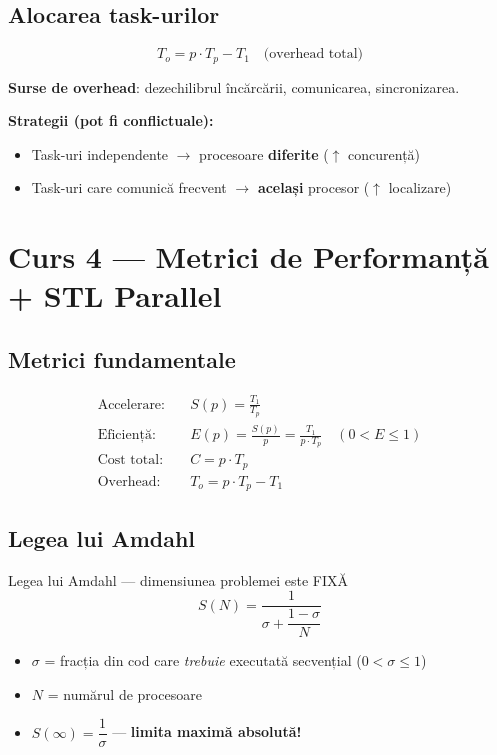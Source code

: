 \documentclass[a4paper,11pt]{article}
\begin{document}
\subsection{Alocarea task-urilor}

\begin{formulabox}
\[
T_o = p \cdot T_p - T_1 \quad \text{(overhead total)}
\]
\end{formulabox}

\textbf{Surse de overhead}: dezechilibrul încărcării, comunicarea, sincronizarea.

\textbf{Strategii (pot fi conflictuale):}
\begin{itemize}[noitemsep]
  \item Task-uri independente $\to$ procesoare \textbf{diferite} ($\uparrow$ concurență)
  \item Task-uri care comunică frecvent $\to$ \textbf{același} procesor ($\uparrow$ localizare)
\end{itemize}

\section{Curs 4 — Metrici de Performanță + STL Parallel}

\subsection{Metrici fundamentale}

\begin{formulabox}
\begin{align*}
\text{Accelerare:} \quad & S(p) = \frac{T_1}{T_p} \\[4pt]
\text{Eficiență:} \quad & E(p) = \frac{S(p)}{p} = \frac{T_1}{p \cdot T_p} \quad (0 < E \leq 1) \\[4pt]
\text{Cost total:} \quad & C = p \cdot T_p \\[4pt]
\text{Overhead:} \quad & T_o = p \cdot T_p - T_1
\end{align*}
\end{formulabox}

\subsection{Legea lui Amdahl}

\begin{defbox}{Legea lui Amdahl — dimensiunea problemei este FIXĂ}
\[
S(N) = \frac{1}{\sigma + \dfrac{1 - \sigma}{N}}
\]
\begin{itemize}[noitemsep]
  \item $\sigma$ = fracția din cod care \emph{trebuie} executată secvențial \quad ($0 < \sigma \leq 1$)
  \item $N$ = numărul de procesoare
  \item $S(\infty) = \dfrac{1}{\sigma}$ — \textbf{limita maximă absolută!}
\end{itemize}
\end{defbox}
\end{document}
